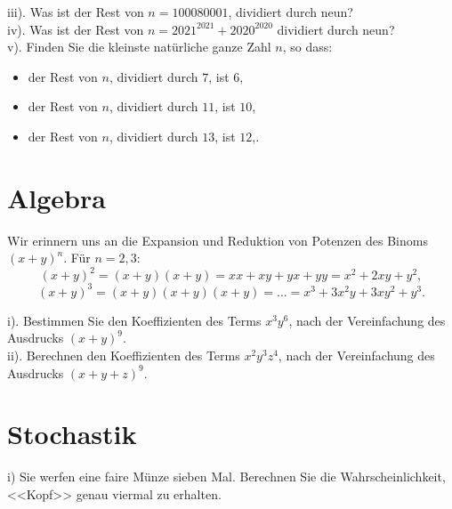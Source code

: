 
iii). Was ist der Rest von $n=100080001$, dividiert durch neun?\\


iv). Was ist der Rest von $n=2021^{2021}+2020^{2020}$ dividiert durch neun?\\


v). Finden Sie die kleinste natürliche ganze Zahl $n$, so dass:
\begin{itemize}
\item der Rest von $n$, dividiert durch $7$, ist $6$,
\item der Rest von $n$, dividiert durch $11$, ist $10$,
\item der Rest von $n$, dividiert durch $13$, ist $12$,.
\end{itemize}


\section*{Algebra}

Wir erinnern uns an die Expansion und Reduktion von Potenzen des Binoms $(x+y)^n$. Für $n=2,3$:
$$(x+y)^2=(x+y)(x+y)=xx+xy+yx+yy= x^2+2xy+y^2,$$
$$(x+y)^3=(x+y)(x+y)(x+y)=\dots = x^3+3x^2y+3xy^2+y^3.$$

i). Bestimmen Sie den Koeffizienten des Terms $x^3y^6$, nach der Vereinfachung des Ausdrucks $(x+y)^{9}$.\\

ii). Berechnen den Koeffizienten des Terms $x^2y^3z^4$, nach der Vereinfachung des Ausdrucks $(x+y+z)^{9}$.


\section*{Stochastik}

i) Sie werfen eine faire Münze sieben Mal. Berechnen Sie die Wahrscheinlichkeit, <<Kopf>> genau viermal zu erhalten.\\

